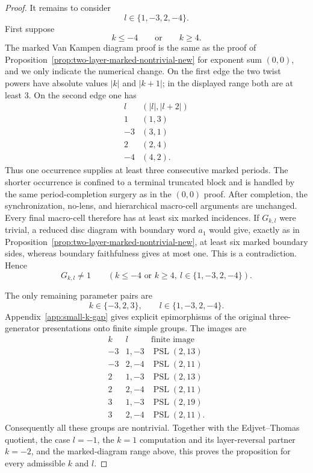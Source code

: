 \documentclass{article}
\begin{document}
\begin{proof}
It remains to consider
\[
 l\in\{1,-3,2,-4\}.
\]
First suppose
\[
 k\leq-4\qquad\text{or}\qquad k\geq4.
\]
The marked Van Kampen diagram proof is the same as the proof of
Proposition~\ref{prop:two-layer-marked-nontrivial-new} for exponent sum
$(0,0)$, and we only indicate the numerical change.  On the first edge the
two twist powers have absolute values $|k|$ and $|k+1|$; in the displayed
range both are at least $3$.  On the second edge one has
\[
\begin{array}{c|c}
 l & (|l|,|l+2|)\\ \hline
 1&(1,3)\\
 -3&(3,1)\\
 2&(2,4)\\
 -4&(4,2).
\end{array}
\]
Thus one occurrence supplies at least three consecutive marked periods.
The shorter occurrence is confined to a terminal truncated block and is
handled by the same period-completion surgery as in the $(0,0)$ proof.
After completion, the synchronization, no-lens, and hierarchical
macro-cell arguments are unchanged.  Every final macro-cell therefore has
at least six marked incidences.  If $G_{k,l}$ were trivial, a reduced disc
diagram with boundary word $a_1$ would give, exactly as in
Proposition~\ref{prop:two-layer-marked-nontrivial-new}, at least six marked
boundary sides, whereas boundary faithfulness gives at most one.  This is a
contradiction.  Hence
\[
 G_{k,l}\neq1
 \qquad
 (k\leq-4\text{ or }k\geq4,
  \ l\in\{1,-3,2,-4\}).
\]

The only remaining parameter pairs are
\[
 k\in\{-3,2,3\},
 \qquad
 l\in\{1,-3,2,-4\}.
\]
Appendix~\ref{app:small-k-gap} gives explicit epimorphisms of the original
three-generator presentations onto finite simple groups.  The images are
\[
\begin{array}{c|c|c}
 k & l & \text{finite image}\\ \hline
 -3 & 1,-3 & \operatorname{PSL}(2,13)\\
 -3 & 2,-4 & \operatorname{PSL}(2,11)\\
  2 & 1,-3 & \operatorname{PSL}(2,13)\\
  2 & 2,-4 & \operatorname{PSL}(2,11)\\
  3 & 1,-3 & \operatorname{PSL}(2,19)\\
  3 & 2,-4 & \operatorname{PSL}(2,11).
\end{array}
\]
Consequently all these groups are nontrivial.  Together with the
Edjvet--Thomas quotient, the case $l=-1$, the $k=1$ computation and its
layer-reversal partner $k=-2$, and the marked-diagram range above, this
proves the proposition for every admissible $k$ and $l$.
\end{proof}
\end{document}

